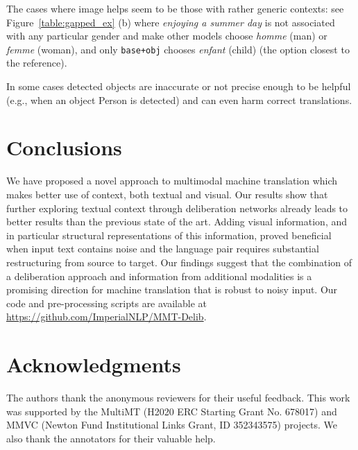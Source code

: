 \documentclass[11pt,a4paper]{article}
\newcommand{\baseattobj}{\texttt{base+obj}\xspace}
\begin{document}
The cases where image helps seem to be those with rather generic contexts: see Figure~\ref{table:gapped_ex} (b) where \textit{enjoying a summer day} is not associated with any particular gender and make other models choose \textit{homme} (man) or \textit{femme} (woman), and only \baseattobj chooses \textit{enfant} (child) (the option closest to the reference).  

In some cases detected objects are inaccurate or not precise enough to be helpful (e.g., when an object Person is detected) and can even harm correct translations. 

\section{Conclusions} \label{sec:concl}
We have proposed a novel approach to multimodal machine translation which makes better use of context, both textual and visual. 
Our results show that further exploring textual context through deliberation networks already leads to better results than the previous state of the art. Adding visual information, and in particular structural representations of this information, proved beneficial when input text contains noise and the language pair requires substantial restructuring from source to target. Our findings suggest that the combination of a deliberation approach and information from additional modalities is a promising direction for machine translation that is robust to noisy input. Our code and pre-processing scripts are available at \url{https://github.com/ImperialNLP/MMT-Delib}.
\section*{Acknowledgments}
The authors thank the anonymous reviewers for their useful feedback. This work was supported by the MultiMT (H2020 ERC Starting Grant No. 678017) and MMVC (Newton
Fund Institutional Links Grant, ID 352343575)
projects. We also thank the annotators for their valuable help.



\newpage
\appendix
\end{document}
